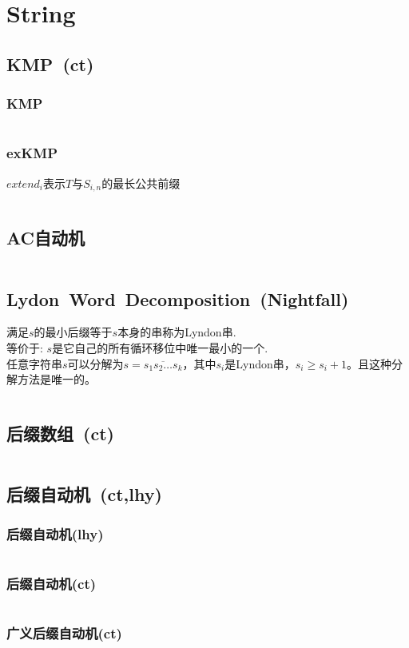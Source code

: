 \chapter{String}
\section{KMP\ \small(ct)}
	\subsection*{KMP}
		\inputminted{cpp}{String/kmp.cpp}
	\subsection*{exKMP}
		$ extend_i $表示$ T $与$ S_{i,n} $的最长公共前缀
		\inputminted{cpp}{String/ex_kmp.cpp}
\section{AC自动机}
	\inputminted{cpp}{String/ac_automaton.cpp}
\section{Lydon\ Word\ Decomposition\ \small(Nightfall)}
	满足$ s $的最小后缀等于$ s $本身的串称为Lyndon串.
	\\等价于: $ s $是它自己的所有循环移位中唯一最小的一个.
	\\任意字符串$ s $可以分解为$ s = \overline{s_1 s_2 \dots s_k} $，其中$ s_i $是Lyndon串，$ s_i \geq s_i + 1 $。且这种分解方法是唯一的。
	\inputminted{cpp}{String/lydon.cpp}
\section{后缀数组\ \small(ct)}
	\inputminted{cpp}{String/suffix_array.cpp}
\section{后缀自动机\ \small(ct,lhy)}
	\subsection*{后缀自动机(lhy)}
		\inputminted{cpp}{String/suffix_automaton_lhy.cpp}
	\subsection*{后缀自动机(ct)}
		\inputminted{cpp}{String/suffix_automaton.cpp}
	\subsection*{广义后缀自动机(ct)}
		\inputminted{cpp}{String/general_suffix_automaton.cpp}
